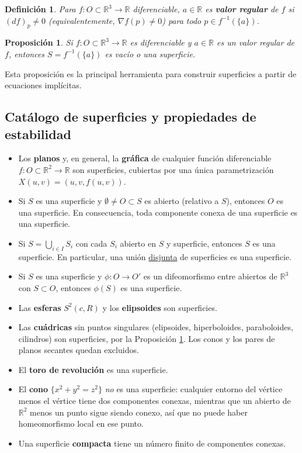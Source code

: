 \documentclass[11pt]{article}
\theoremstyle{plain}
\newtheorem{definicion}[teorema]{Definición}
\newtheorem{proposicion}[teorema]{Proposición}
\theoremstyle{definition}
\theoremstyle{remark}
\begin{document}
\begin{definicion}
Para $f:O\subset\mathbb{R}^3\to\mathbb{R}$ diferenciable, $a\in\mathbb{R}$ es \textbf{valor regular} de $f$ si $(df)_p\neq0$ (equivalentemente, $\nabla f(p)\neq0$) para todo $p\in f^{-1}(\{a\})$.
\end{definicion}

\begin{proposicion}\label{prop:valor_regular}
Si $f:O\subset\mathbb{R}^3\to\mathbb{R}$ es diferenciable y $a\in\mathbb{R}$ es un valor regular de $f$, entonces $S=f^{-1}(\{a\})$ es vacío o una superficie.
\end{proposicion}

\noindent Esta proposición es la principal herramienta para construir superficies a partir de ecuaciones implícitas.

\subsection{Catálogo de superficies y propiedades de estabilidad}

\begin{itemize}
\item Los \textbf{planos} y, en general, la \textbf{gráfica} de cualquier función diferenciable $f:O\subset\mathbb{R}^2\to\mathbb{R}$ son superficies, cubiertas por una única parametrización $X(u,v)=(u,v,f(u,v))$.
\item Si $S$ es una superficie y $\emptyset\neq O\subset S$ es abierto (relativo a $S$), entonces $O$ es una superficie. En consecuencia, toda componente conexa de una superficie es una superficie.
\item Si $S=\bigcup_{i\in I} S_i$ con cada $S_i$ abierto en $S$ y superficie, entonces $S$ es una superficie. En particular, una unión \underline{disjunta} de superficies es una superficie.
\item Si $S$ es una superficie y $\phi:O\to O'$ es un difeomorfismo entre abiertos de $\mathbb{R}^3$ con $S\subset O$, entonces $\phi(S)$ es una superficie.
\item Las \textbf{esferas} $S^2(c,R)$ y los \textbf{elipsoides} son superficies.
\item Las \textbf{cuádricas} sin puntos singulares (elipsoides, hiperboloides, paraboloides, cilindros) son superficies, por la Proposición \ref{prop:valor_regular}. Los conos y los pares de planos secantes quedan excluidos.
\item El \textbf{toro de revolución} es una superficie.
\item El \textbf{cono} $\{x^2+y^2=z^2\}$ \emph{no} es una superficie: cualquier entorno del vértice menos el vértice tiene dos componentes conexas, mientras que un abierto de $\mathbb{R}^2$ menos un punto sigue siendo conexo, así que no puede haber homeomorfismo local en ese punto.
\item Una superficie \textbf{compacta} tiene un número finito de componentes conexas.
\end{itemize}
\end{document}

